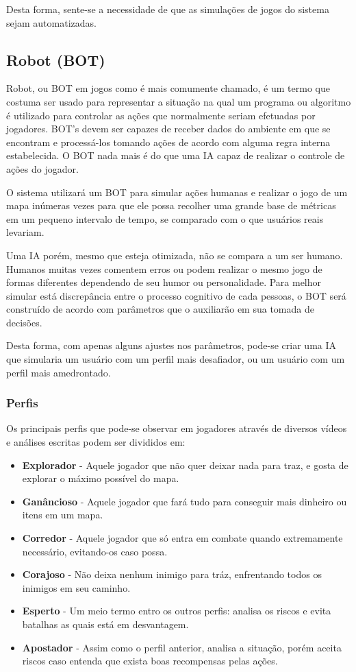 Desta forma, sente-se a necessidade de que as simulações de jogos do sistema sejam automatizadas. 

\subsection{Robot (BOT)}

Robot, ou BOT em jogos como é mais comumente chamado, é um termo que costuma ser usado para representar a situação na qual um programa ou algoritmo é utilizado para controlar as ações que normalmente seriam efetuadas por jogadores. BOT's devem ser capazes de receber dados do ambiente em que se encontram e processá-los tomando ações de acordo com alguma regra interna estabelecida. O BOT nada mais é do que uma IA capaz de realizar o controle de ações do jogador. 

O sistema utilizará um BOT para simular ações humanas e realizar o jogo de um mapa inúmeras vezes para que ele possa recolher uma grande base de métricas em um pequeno intervalo de tempo, se comparado com o que usuários reais levariam. 

Uma IA porém, mesmo que esteja otimizada, não se compara a um ser humano. Humanos muitas vezes comentem erros ou podem realizar o mesmo jogo de formas diferentes dependendo de seu humor ou personalidade.
Para melhor simular está discrepância entre o processo cognitivo de cada pessoas, o BOT será construído de acordo com parâmetros que o auxiliarão em sua tomada de decisões. 

Desta forma, com apenas alguns ajustes nos parâmetros, pode-se criar uma IA que simularia um usuário com um perfil mais desafiador, ou um usuário com um perfil mais amedrontado. 

\subsubsection{Perfis}

Os principais perfis que pode-se observar em jogadores através de diversos vídeos \cite{letsplay1} \cite{letsplay2} \cite{letsplay3} e análises escritas podem ser divididos em:

\begin{itemize}
	\item \textbf{Explorador} - Aquele jogador que não quer deixar nada para traz, e gosta de explorar o máximo possível do mapa.
	\item \textbf{Ganâncioso} - Aquele jogador que fará tudo para conseguir mais dinheiro ou itens em um mapa. 
	\item \textbf{Corredor} - Aquele jogador que só entra em combate quando extremamente necessário, evitando-os caso possa.
	\item \textbf{Corajoso} - Não deixa nenhum inimigo para tráz, enfrentando todos os inimigos em seu caminho.
	\item \textbf{Esperto} - Um meio termo entro os outros perfis: analisa os riscos e evita batalhas as quais está em desvantagem.
	\item \textbf{Apostador} - Assim como o perfil anterior, analisa a situação, porém aceita riscos caso entenda que exista boas recompensas pelas ações.
\end{itemize}

